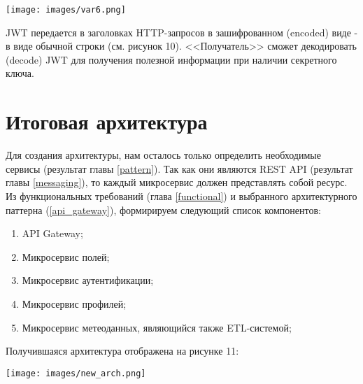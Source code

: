     \noindent\begin{minipage}[t]{\textwidth}
                 \begin{center}
                 \texttt{[image: images/var6.png]}
                 \end{center} \label{fig:Moreno}
            
            \end{minipage}


    
    JWT передается в заголовках HTTP-запросов в зашифрованном (encoded) виде - в виде обычной строки (см. рисунок 10). <<Получатель>> сможет декодировать (decode) JWT для получения полезной информации при наличии секретного ключа.


    \section{Итоговая архитектура}

    Для создания архитектуры, нам осталось только определить необходимые сервисы (результат главы \ref{pattern}). Так как они являются REST API (результат главы \ref{messaging}), то каждый микросервис должен представлять собой ресурс. 
    Из функциональных требований (глава \ref{functional}) и выбранного архитектурного паттерна (\ref{api_gateway}), формирируем следующий список компонентов:
    \begin{enumerate}
        \item API Gateway;
        \item Микросервис полей;
        \item Микросервис аутентификации;
        \item Микросервис профилей;
        \item Микросервис метеоданных, являющийся также ETL-системой;
    \end{enumerate}
    
    
    Получившаяся архитектура отображена на рисунке 11:

     \noindent\begin{minipage}[t]{\textwidth}
                 \begin{center}
                 \texttt{[image: images/new\_arch.png]}
                 \end{center} \label{fig:Moreno}
            
            \end{minipage}

